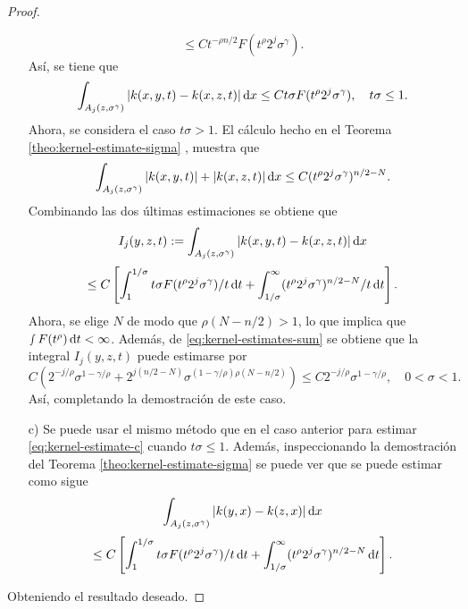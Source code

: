 \begin{proof}
\begin{itemize}
\begin{equation*}
		\end{equation*}
		\begin{equation*}
			\leq C t^{-\rho n/2} F(t^\rho2^j\sigma^\gamma).
		\end{equation*}
		Así, se tiene que 
		\begin{equation*}
			\int_{A_j(z, \sigma^\gamma)} |k(x, y, t) - k(x, z, t)| \mathop{}\!\mathrm{d} x \leq Ct\sigma F(t^\rho 2^j\sigma^\gamma), \quad t\sigma \leq 1.
		\end{equation*}
		Ahora, se considera el caso $t\sigma>1$. El cálculo hecho en el Teorema \ref{theo:kernel-estimate-sigma} , muestra que 
		\begin{equation*}
			\int_{A_j(z, \sigma^\gamma)} |k(x, y, t)| + |k(x, z, t)| \mathop{}\!\mathrm{d} x \leq C (t^\rho 2^j \sigma^\gamma )^{n/2 - N}.
		\end{equation*} 
		Combinando las dos últimas estimaciones se obtiene que 
		\begin{equation*}
			I_{j}(y, z, t) := \int_{A_j(z, \sigma^\gamma)} |k(x, y, t)-k(x, z, t)| \mathop{}\!\mathrm{d} x 
		\end{equation*}
		\begin{equation}
			\leq 
			C \left[  \int_1^{1/\sigma} t\sigma F(t^\rho 2^j \sigma^\gamma )/t\mathop{}\!\mathrm{d} t + \int_{1/\sigma}^\infty (t^\rho 2^j \sigma^\gamma )^{n/2 - N}/t \mathop{}\!\mathrm{d} t \right].
			\label{eq:kernel-estimates-sum}
		\end{equation}
		Ahora, se elige $N$ de modo que $\rho(N-n/2)>1$, lo que implica que $\smallint F(t^\rho)\mathop{}\!\mathrm{d} t < \infty$. Además, de \cref{eq:kernel-estimates-sum} se obtiene que la integral $I_j(y, z, t)$ puede estimarse por
		\begin{equation*}
			C\left(  2^{-j/\rho} \sigma^{1-\gamma/\rho} + 2^{j(n/2 -N)} \sigma^{(1-\gamma/\rho)\rho(N-n/2)} 
			\right)  \leq C2^{-j/\rho} \sigma^{1-\gamma/\rho}, \quad 0<\sigma<1.
		\end{equation*}
		Así, completando la demostración de este caso. 
		
		\item[c)] Se puede usar el mismo método que en el caso anterior para estimar \cref{eq:kernel-estimate-c} cuando $t\sigma\leq1$. Además, inspeccionando la demostración del Teorema \ref{theo:kernel-estimate-sigma} se puede ver que se puede estimar como sigue 
		\begin{equation*}
			\int_{A_j(z, \sigma^\gamma)} |k(y, x) - k(z, x)|\mathop{}\!\mathrm{d} x  
		\end{equation*}
		\begin{equation*}
			\leq C \left[  \int_1^{1/\sigma} t\sigma F(t^\rho 2^j \sigma^\gamma )/t\mathop{}\!\mathrm{d} t + \int_{1/\sigma}^\infty (t^\rho2^j\sigma^\gamma)^{n/2 - N} \mathop{}\!\mathrm{d} t   \right].
		\end{equation*}        
	\end{itemize}
	Obteniendo el resultado deseado.
\end{proof}
